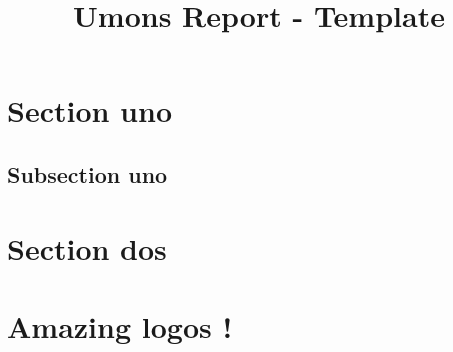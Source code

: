 \documentclass{umonsreport}
\begin{document}

\title{Umons Report - Template}




        
\margin %
\maketitlepg %
\tableofcontents
\newpage



\section{Section uno} 

\lipsum[3-4]

\subsection{Subsection uno}

\lipsum[3-4]

\section{Section dos}

\lipsum[3-5]

\section{Amazing logos !}

\end{document}
